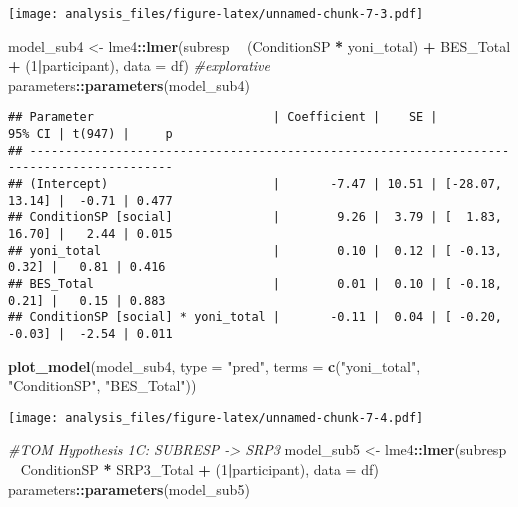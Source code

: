 \documentclass[
]{article}
\newenvironment{Shaded}{\begin{snugshade}}{\end{snugshade}}
\newcommand{\CommentTok}[1]{\textcolor[rgb]{0.56,0.35,0.01}{\textit{#1}}}
\newcommand{\DataTypeTok}[1]{\textcolor[rgb]{0.13,0.29,0.53}{#1}}
\newcommand{\DecValTok}[1]{\textcolor[rgb]{0.00,0.00,0.81}{#1}}
\newcommand{\KeywordTok}[1]{\textcolor[rgb]{0.13,0.29,0.53}{\textbf{#1}}}
\newcommand{\NormalTok}[1]{#1}
\newcommand{\OperatorTok}[1]{\textcolor[rgb]{0.81,0.36,0.00}{\textbf{#1}}}
\newcommand{\StringTok}[1]{\textcolor[rgb]{0.31,0.60,0.02}{#1}}
\begin{document}
\texttt{[image: analysis\_files/figure-latex/unnamed-chunk-7-3.pdf]}

\begin{Shaded}
\begin{Highlighting}[]
\NormalTok{model_sub4 <-}\StringTok{ }\NormalTok{lme4}\OperatorTok{::}\KeywordTok{lmer}\NormalTok{(subresp }\OperatorTok{~}\StringTok{ }\NormalTok{(ConditionSP }\OperatorTok{*}\StringTok{ }\NormalTok{yoni_total) }\OperatorTok{+}\StringTok{ }\NormalTok{BES_Total }\OperatorTok{+}\StringTok{ }\NormalTok{(}\DecValTok{1}\OperatorTok{|}\NormalTok{participant), }\DataTypeTok{data =}\NormalTok{ df)  }\CommentTok{#explorative}
\NormalTok{parameters}\OperatorTok{::}\KeywordTok{parameters}\NormalTok{(model_sub4)}
\end{Highlighting}
\end{Shaded}

\begin{verbatim}
## Parameter                         | Coefficient |    SE |          95% CI | t(947) |     p
## ------------------------------------------------------------------------------------------
## (Intercept)                       |       -7.47 | 10.51 | [-28.07, 13.14] |  -0.71 | 0.477
## ConditionSP [social]              |        9.26 |  3.79 | [  1.83, 16.70] |   2.44 | 0.015
## yoni_total                        |        0.10 |  0.12 | [ -0.13,  0.32] |   0.81 | 0.416
## BES_Total                         |        0.01 |  0.10 | [ -0.18,  0.21] |   0.15 | 0.883
## ConditionSP [social] * yoni_total |       -0.11 |  0.04 | [ -0.20, -0.03] |  -2.54 | 0.011
\end{verbatim}

\begin{Shaded}
\begin{Highlighting}[]
\KeywordTok{plot_model}\NormalTok{(model_sub4, }\DataTypeTok{type =} \StringTok{"pred"}\NormalTok{, }\DataTypeTok{terms =} \KeywordTok{c}\NormalTok{(}\StringTok{"yoni_total"}\NormalTok{, }\StringTok{"ConditionSP"}\NormalTok{, }\StringTok{"BES_Total"}\NormalTok{))}
\end{Highlighting}
\end{Shaded}

\texttt{[image: analysis\_files/figure-latex/unnamed-chunk-7-4.pdf]}

\begin{Shaded}
\begin{Highlighting}[]
\CommentTok{#TOM Hypothesis 1C: SUBRESP -> SRP3}
\NormalTok{model_sub5 <-}\StringTok{ }\NormalTok{lme4}\OperatorTok{::}\KeywordTok{lmer}\NormalTok{(subresp }\OperatorTok{~}\StringTok{ }\NormalTok{ConditionSP }\OperatorTok{*}\StringTok{ }\NormalTok{SRP3_Total }\OperatorTok{+}\StringTok{ }\NormalTok{(}\DecValTok{1}\OperatorTok{|}\NormalTok{participant), }\DataTypeTok{data =}\NormalTok{ df)}
\NormalTok{parameters}\OperatorTok{::}\KeywordTok{parameters}\NormalTok{(model_sub5)}
\end{Highlighting}
\end{Shaded}
\end{document}

